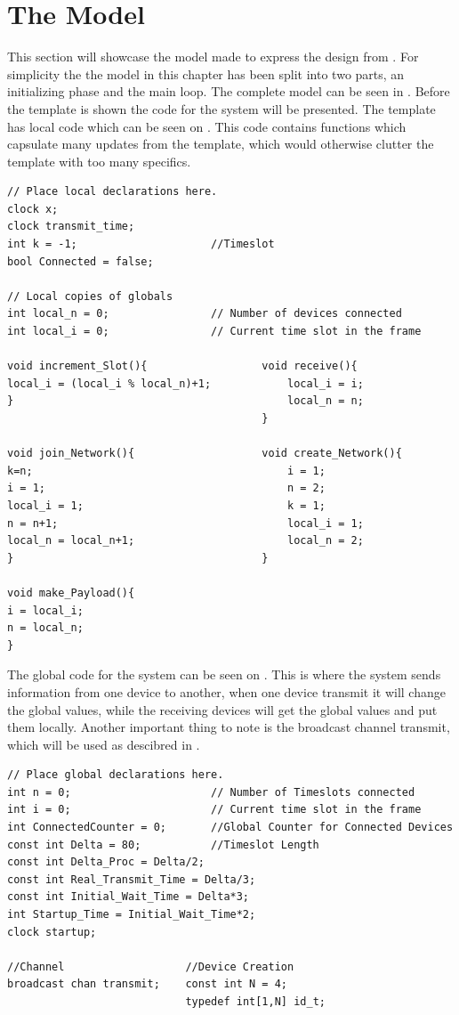 \section{The Model}\label{sec:themodel}
This section will showcase the model made to express the design from .
For simplicity the the model in this chapter has been split into two parts, an initializing phase and the main loop.
The complete model can be seen in .
Before the template is shown the code for the system will be presented.
The template has local code which can be seen on .
This code contains functions which capsulate many updates from the template, which would otherwise clutter the template with too many specifics.

\begin{lstlisting}[language={[GUI]Uppaal}, % use GUI flavor
columns={[l]flexible},
frameround=fftt, frame=shadowbox, rulesepcolor=\color{gray},
caption={Local code for Device.}, label={device_local}]
// Place local declarations here.
clock x;
clock transmit_time;
int k = -1;               		//Timeslot
bool Connected = false;

// Local copies of globals
int local_n = 0;          		// Number of devices connected
int local_i = 0;          		// Current time slot in the frame

void increment_Slot(){					void receive(){
local_i = (local_i % local_n)+1;			local_i = i;
}											local_n = n;
										}

void join_Network(){					void create_Network(){
k=n;										i = 1;
i = 1;										n = 2;
local_i = 1;								k = 1;
n = n+1;									local_i = 1;
local_n = local_n+1;						local_n = 2;
}										}

void make_Payload(){
i = local_i;
n = local_n;
}
\end{lstlisting}

The global code for the system can be seen on .
This is where the system sends information from one device to another, when one device transmit it will change the global values, while the receiving devices will get the global values and put them locally.
Another important thing to note is the broadcast channel transmit, which will be used as descibred in .

\begin{lstlisting}[language={[GUI]Uppaal}, % use GUI flavor
columns={[l]flexible},
frameround=fftt, frame=shadowbox, rulesepcolor=\color{gray},
caption={Code for the global declarations.}, label={uppaal_Global}]
// Place global declarations here.
int n = 0;                      // Number of Timeslots connected
int i = 0;                      // Current time slot in the frame
int ConnectedCounter = 0;       //Global Counter for Connected Devices
const int Delta = 80;           //Timeslot Length
const int Delta_Proc = Delta/2;
const int Real_Transmit_Time = Delta/3;
const int Initial_Wait_Time = Delta*3;
int Startup_Time = Initial_Wait_Time*2;
clock startup;

//Channel					//Device Creation
broadcast chan transmit;	const int N = 4;
							typedef int[1,N] id_t;
\end{lstlisting}

